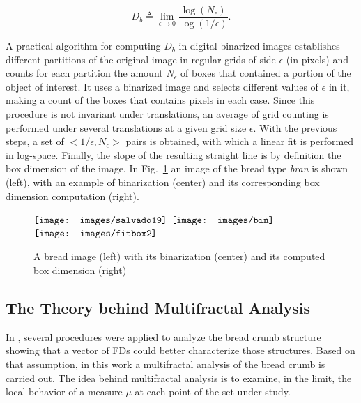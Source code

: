 \begin{equation}
D_{b} \triangleq \displaystyle\lim_{\epsilon \to 0}{\frac{\log(N_{\epsilon})}{\log (1/\epsilon)}}.
\label{eqn:1}
\end{equation}

A practical algorithm for computing $D_{b}$ in digital binarized images establishes different partitions of the original image in regular grids of side $\epsilon$ (in pixels) and counts for each partition the amount $N_{\epsilon}$ of boxes that contained a portion of the object of interest. It uses a binarized image and selects different values of $\epsilon$ in it, making a count of the boxes that contains pixels in each case. Since this procedure is not invariant under translations, an average of grid counting is performed under several translations at a given grid size $\epsilon$.­ With the previous steps, a set of $<1/\epsilon, N_\epsilon>$ pairs is obtained, with which a linear fit is performed in log-space. Finally, the slope of the resulting straight line is by definition the box dimension of the image. In Fig.~\ref{fig:fitbox} an image of the bread type {\em bran} is shown (left), with an example of binarization (center) and its corresponding box dimension computation (right).

\begin{figure}[htb]
\centering
$\vcenter{\hbox{\texttt{[image: images/salvado19]}}}$
$\vcenter{\hbox{\texttt{[image: images/bin]}}}$
$\vcenter{\hbox{\texttt{[image: images/fitbox2]}}}$
\caption{A bread image (left) with its binarization (center) and its computed box dimension (right)}
\label{fig:fitbox}
\end{figure}


\subsection{The Theory behind Multifractal Analysis}
\label{sec:4}

In \cite{Gonzales2008}, several procedures were applied to analyze the bread crumb structure showing that a vector of FDs could better characterize those structures. Based on that assumption, in this work a multifractal analysis of the bread crumb is carried out. The idea behind multifractal analysis is to examine, in the limit, the local behavior of a measure $\mu$ at each point of the set under study. 


